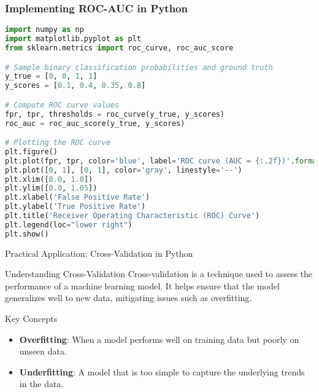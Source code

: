 \documentclass[aspectratio=169]{beamer}
\begin{document}
\begin{frame}[fragile]
    \frametitle{Implementing ROC-AUC in Python}
    \begin{lstlisting}[language=Python]
import numpy as np
import matplotlib.pyplot as plt
from sklearn.metrics import roc_curve, roc_auc_score

# Sample binary classification probabilities and ground truth
y_true = [0, 0, 1, 1]
y_scores = [0.1, 0.4, 0.35, 0.8]

# Compute ROC curve values
fpr, tpr, thresholds = roc_curve(y_true, y_scores)
roc_auc = roc_auc_score(y_true, y_scores)

# Plotting the ROC curve
plt.figure()
plt.plot(fpr, tpr, color='blue', label='ROC curve (AUC = {:.2f})'.format(roc_auc))
plt.plot([0, 1], [0, 1], color='gray', linestyle='--')
plt.xlim([0.0, 1.0])
plt.ylim([0.0, 1.05])
plt.xlabel('False Positive Rate')
plt.ylabel('True Positive Rate')
plt.title('Receiver Operating Characteristic (ROC) Curve')
plt.legend(loc="lower right")
plt.show()
    \end{lstlisting}
\end{frame}

\begin{frame}{Practical Application: Cross-Validation in Python}
    \begin{block}{Understanding Cross-Validation}
        Cross-validation is a technique used to assess the performance of a machine learning model. 
        It helps ensure that the model generalizes well to new data, mitigating issues such as overfitting.
    \end{block}
\end{frame}

\begin{frame}{Key Concepts}
    \begin{itemize}
        \item \textbf{Overfitting}: When a model performs well on training data but poorly on unseen data.
        \item \textbf{Underfitting}: A model that is too simple to capture the underlying trends in the data.
    \end{itemize}
\end{frame}
\end{document}
